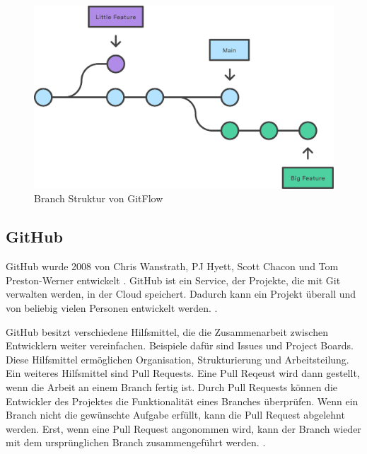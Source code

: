 \newpage
\begin{figure}[!ht]
   \centering
   \includegraphics[width=\textwidth-2cm]{images/theorie/git-branch.png}
   \caption{Branch Struktur von GitFlow \cite{atlassian_git-flow-workflow_nodate}}\label{fig:git-branch}
\end{figure}
 
\subsection{GitHub}\label{sub:t_git_gh}
GitHub wurde 2008 von Chris Wanstrath, PJ Hyett, Scott Chacon und Tom
Preston-Werner entwickelt \cite{noauthor_github_2021}. GitHub ist ein Service,
der Projekte, die mit Git verwalten werden, in der Cloud speichert. Dadurch kann
ein Projekt überall und von beliebig vielen Personen entwickelt werden.
\cite{noauthor_github_2021}.
 
GitHub besitzt verschiedene Hilfsmittel, die die Zusammenarbeit zwischen
Entwicklern weiter vereinfachen. Beispiele dafür sind
\guillemotleft{}Issues\guillemotright{} und \guillemotleft{}Project
Boards\guillemotright{}. Diese Hilfsmittel ermöglichen Organisation,
Strukturierung und Arbeitsteilung. Ein weiteres Hilfsmittel sind Pull Requests.
Eine Pull Reqeust wird dann gestellt, wenn die Arbeit an einem Branch fertig
ist. Durch Pull Requests können die Entwickler des Projektes die Funktionalität
eines Branches überprüfen. Wenn ein Branch nicht die gewünschte Aufgabe erfüllt,
kann die Pull Request abgelehnt werden. Erst, wenn eine Pull Request angonommen
wird, kann der Branch wieder mit dem ursprünglichen Branch zusammengeführt
werden. \cite{atlassian_pull_nodate}.
